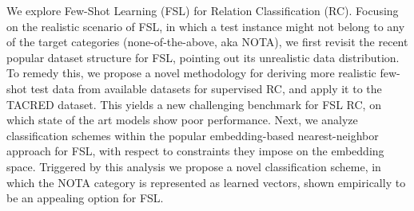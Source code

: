 We explore Few-Shot Learning (FSL) for Relation Classification (RC). Focusing on the realistic scenario of FSL, in which a test instance might not belong to any of the target categories (none-of-the-above, aka NOTA), we first revisit the recent popular dataset structure for FSL, pointing out its unrealistic data distribution. To remedy this, we propose a novel methodology for deriving more realistic few-shot test data from available datasets for supervised RC, and apply it to the TACRED dataset. This yields a new challenging benchmark for FSL RC, on which state of the art models show poor performance. Next, we analyze classification schemes within the popular embedding-based nearest-neighbor approach for FSL, with respect to constraints they impose on the embedding space. Triggered by this analysis we propose a novel classification scheme, in which the NOTA category is represented as learned vectors, shown empirically to be an appealing option for FSL.